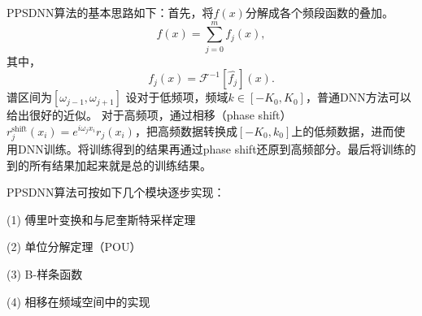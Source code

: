 PPSDNN算法的基本思路如下：首先，将$f(x)$分解成各个频段函数的叠加。
\begin{equation}
f(x)=%
{\displaystyle\sum\limits_{j=0}^{m}}
f_{j}(x), \label{x-decomp}%
\end{equation}
其中，
\[
f_{j}(x)=\mathcal{F}^{-1}[\widehat{f_{j}}](x).
\]
谱区间为$[\omega _{j-1},\omega _{j+1}]$
设对于低频项，频域$k\in [-K_0,K_0]$，普通DNN方法可以给出很好的近似。
对于高频项，通过相移（phase shift）$r_{j}^{\text{shift}}(x_{i})=e^{i\omega_{j}x_{i}}r_{j}(x_{i})$，把高频数据转换成$[-K_0,k_0]$上的低频数据，进而使用DNN训练。将训练得到的结果再通过phase shift还原到高频部分。最后将训练的到的所有结果加起来就是总的训练结果。

PPSDNN算法可按如下几个模块逐步实现：

    (1) 傅里叶变换和与尼奎斯特采样定理\cite{vaidyanathan2001generalizations}

    (2) 单位分解定理（POU）

    (3) B-样条函数

    (4) 相移在频域空间中的实现

